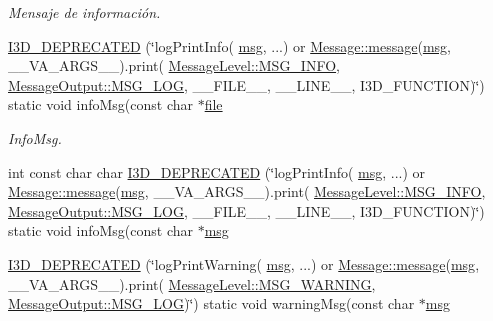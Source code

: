 \begin{DoxyCompactItemize}
\begin{DoxyCompactList}\small\item\em Mensaje de información. \end{DoxyCompactList}\item 
\hyperlink{class_i3_d_1_1_log_msg_a3210f5f7a24f6a954eafd82bcad65464}{I3\+D\+\_\+\+D\+E\+P\+R\+E\+C\+A\+T\+ED} (\char`\"{}log\+Print\+Info( \hyperlink{class_i3_d_1_1_log_msg_a5a1ceb27d9529de8eb9b3fc9377e178a}{msg}, ...) or \hyperlink{class_i3_d_1_1_message_a525f877a41a1e7493188b2b720d1d254}{Message\+::message}(\hyperlink{class_i3_d_1_1_log_msg_a5a1ceb27d9529de8eb9b3fc9377e178a}{msg}, \+\_\+\+\_\+\+V\+A\+\_\+\+A\+R\+G\+S\+\_\+\+\_\+).print( \hyperlink{namespace_i3_d_a1c1740d2076e09b1a37b82e45a0327b5ad5150815f57a5219a42da2f42f90861e}{Message\+Level\+::\+M\+S\+G\+\_\+\+I\+N\+FO}, \hyperlink{namespace_i3_d_a2ccb65ac6e08844c1175a235107fa103a8c1a4761ebfadb227927517230ff7b02}{Message\+Output\+::\+M\+S\+G\+\_\+\+L\+OG}, \+\_\+\+\_\+\+F\+I\+L\+E\+\_\+\+\_\+, \+\_\+\+\_\+\+L\+I\+N\+E\+\_\+\+\_\+, I3\+D\+\_\+\+F\+U\+N\+C\+T\+I\+ON)\char`\"{}) static void info\+Msg(const char $\ast$\hyperlink{class_i3_d_1_1_log_msg_ab59f20d39ef112d2196371ae0636d77c}{file}
\begin{DoxyCompactList}\small\item\em Info\+Msg. \end{DoxyCompactList}\item 
int const char char \hyperlink{class_i3_d_1_1_log_msg_af056d8e2ad9e297f51051e04ca789023}{I3\+D\+\_\+\+D\+E\+P\+R\+E\+C\+A\+T\+ED} (\char`\"{}log\+Print\+Info( \hyperlink{class_i3_d_1_1_log_msg_a5a1ceb27d9529de8eb9b3fc9377e178a}{msg}, ...) or \hyperlink{class_i3_d_1_1_message_a525f877a41a1e7493188b2b720d1d254}{Message\+::message}(\hyperlink{class_i3_d_1_1_log_msg_a5a1ceb27d9529de8eb9b3fc9377e178a}{msg}, \+\_\+\+\_\+\+V\+A\+\_\+\+A\+R\+G\+S\+\_\+\+\_\+).print( \hyperlink{namespace_i3_d_a1c1740d2076e09b1a37b82e45a0327b5ad5150815f57a5219a42da2f42f90861e}{Message\+Level\+::\+M\+S\+G\+\_\+\+I\+N\+FO}, \hyperlink{namespace_i3_d_a2ccb65ac6e08844c1175a235107fa103a8c1a4761ebfadb227927517230ff7b02}{Message\+Output\+::\+M\+S\+G\+\_\+\+L\+OG}, \+\_\+\+\_\+\+F\+I\+L\+E\+\_\+\+\_\+, \+\_\+\+\_\+\+L\+I\+N\+E\+\_\+\+\_\+, I3\+D\+\_\+\+F\+U\+N\+C\+T\+I\+ON)\char`\"{}) static void info\+Msg(const char $\ast$\hyperlink{class_i3_d_1_1_log_msg_a5a1ceb27d9529de8eb9b3fc9377e178a}{msg}
\item 
\hyperlink{class_i3_d_1_1_log_msg_ae6ccebe5cd21bc2bcb57790a060c4561}{I3\+D\+\_\+\+D\+E\+P\+R\+E\+C\+A\+T\+ED} (\char`\"{}log\+Print\+Warning( \hyperlink{class_i3_d_1_1_log_msg_a5a1ceb27d9529de8eb9b3fc9377e178a}{msg}, ...) or \hyperlink{class_i3_d_1_1_message_a525f877a41a1e7493188b2b720d1d254}{Message\+::message}(\hyperlink{class_i3_d_1_1_log_msg_a5a1ceb27d9529de8eb9b3fc9377e178a}{msg}, \+\_\+\+\_\+\+V\+A\+\_\+\+A\+R\+G\+S\+\_\+\+\_\+).print( \hyperlink{namespace_i3_d_a1c1740d2076e09b1a37b82e45a0327b5a124799373c019c5c7480f21a24104688}{Message\+Level\+::\+M\+S\+G\+\_\+\+W\+A\+R\+N\+I\+NG}, \hyperlink{namespace_i3_d_a2ccb65ac6e08844c1175a235107fa103a8c1a4761ebfadb227927517230ff7b02}{Message\+Output\+::\+M\+S\+G\+\_\+\+L\+OG})\char`\"{}) static void warning\+Msg(const char $\ast$\hyperlink{class_i3_d_1_1_log_msg_a5a1ceb27d9529de8eb9b3fc9377e178a}{msg}

\end{DoxyCompactItemize}
